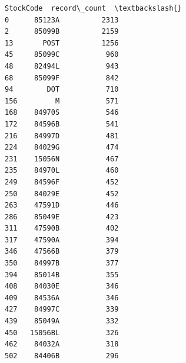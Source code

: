 \documentclass[11pt]{article}
\begin{document}
    
    \begin{Verbatim}[commandchars=\\\{\}]
    StockCode  record\_count  \textbackslash{}
0      85123A          2313   
2      85099B          2159   
13       POST          1256   
45     85099C           960   
48     82494L           943   
68     85099F           842   
94        DOT           710   
156         M           571   
168    84970S           546   
172    84596B           541   
216    84997D           481   
224    84029G           474   
231    15056N           467   
235    84970L           460   
249    84596F           452   
250    84029E           452   
263    47591D           446   
286    85049E           423   
311    47590B           402   
317    47590A           394   
346    47566B           379   
350    84997B           377   
394    85014B           355   
408    84030E           346   
409    84536A           346   
427    84997C           339   
439    85049A           332   
450   15056BL           326   
462    84032A           318   
502    84406B           296   


\end{Verbatim}
\end{document}
